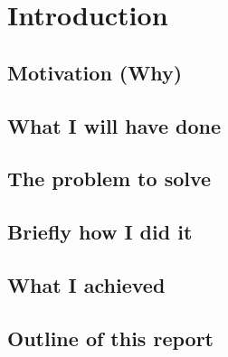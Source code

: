 \chapter{Introduction}\label{chapter:intro}
  \section{Motivation (Why)}

  \section{What I will have done}
  
  \section{The problem to solve}
  
  \section{Briefly how I did it}

  \section{What I achieved}

  \section{Outline of this report}
